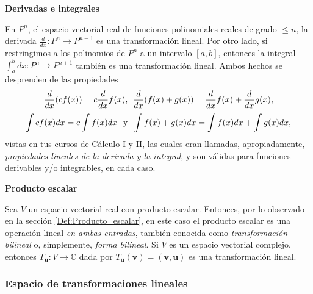 \documentclass[12pt]{article}
\begin{document}
\vspace{3mm}

\textbf{Derivadas e integrales} 

En $P^n$, el espacio vectorial real de funciones polinomiales reales de grado $\leq n$, la derivada $\frac{d}{dx}:P^n\to P^{n-1}$ es una transformación lineal. Por otro lado, si restringimos a los polinomios de $P^n$ a un intervalo $[a,b]$, entonces la integral $\int_a^b dx:P^n\to P^{n+1}$ también es una transformación lineal. Ambos hechos se desprenden de las propiedades $$\frac{d}{dx}(cf(x))=c\frac{d}{dx}f(x), \hspace{1.5mm} \frac{d}{dx}(f(x)+g(x))=\frac{d}{dx}f(x)+\frac{d}{dx}g(x),$$ $$\int cf(x) dx=c\int f(x) dx\hspace{2.5mm}\text{y}\hspace{2mm} \int f(x)+g(x) dx = \int f(x) dx + \int g(x) dx,$$ vistas en tus cursos de Cálculo I y II, las cuales eran llamadas, apropiadamente, \emph{propiedades lineales de la derivada y la integral}, y son válidas para funciones derivables y/o integrables, en cada caso.
\vspace{3mm}

\textbf{Producto escalar} 

Sea $V$ un espacio vectorial real con producto escalar. Entonces, por lo observado en la sección \ref{Def:Producto_escalar}, en este caso el producto escalar es una operación lineal \emph{en ambas entradas}, también conocida como \emph{transformación bilineal} o, simplemente, \emph{forma bilineal}. Si $V$ es un espacio vectorial complejo, entonces $T_{\mathbf{u}}:V\to \mathbb{C}$ dada por $T_{\mathbf{u}}(\mathbf{v})=(\mathbf{v},\mathbf{u})$ es una transformación lineal.

\subsubsection{Espacio de transformaciones lineales}
\end{document}
